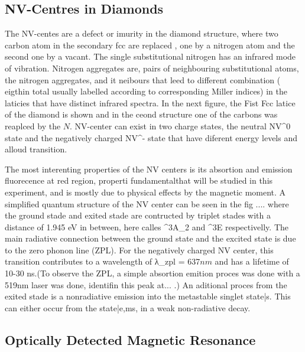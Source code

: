 \subsection{NV-Centres in Diamonds}
 The NV-centes are a defect or imurity in the diamond structure, where two carbon atom in the secondary fcc are replaced , one by a nitrogen atom and the second one by a  vacant. The single substitutional nitrogen has an infrared mode of vibration. Nitrogen aggregates are, pairs of neighbouring substitutional atoms, the nitrogen aggregates, and it neibours that leed to different combination ( eigthin total usually labelled according to corresponding Miller indices) in the laticies that have distinct infrared spectra. In the next figure, the Fist Fcc latice of the diamond is shown and in the ceond structure one of the carbons was reaplced by the $N$. NV-center can exist in two charge states, the neutral NV^{0} state and the negatively charged NV^{-} state that have diferent energy levels and alloud transition.
 
The most interenting properties of the NV centers is its absortion and emission fluorecence at red region, properti fundamentalthat will be studied in this experiment, and is mostly due to physical eﬀects by the magnetic moment. A simpliﬁed quantum structure of the NV center can be seen in the fig .... where the ground stade and exited stade are contructed by triplet stades with a distance of 1.945 eV in between, here calles ^{3}A_{2} and ^{3}E  respectivelly. The main radiative connection between the ground state and the excited state is due to the zero phonon line (ZPL). For the negatively charged NV center, this transition contributes to a wavelength of λ_{zpl} = 637$nm$ and has a lifetime of 10-30 ns.(To observe the ZPL, a simple absortion emition proces was done with a 519nm laser was done, identifin this peak at... .) 
An aditional proces from the exited stade is a nonradiative emission into the metastable singlet state\left|s\right\rangle . This can either occur from the state|e,ms\right\rangle , in a weak non-radiative decay.


\subsection{Optically Detected Magnetic Resonance}
